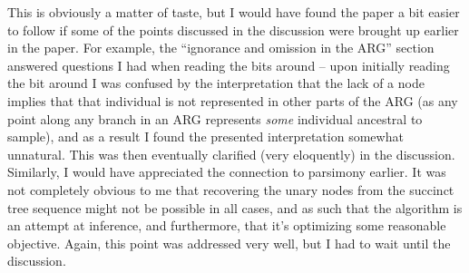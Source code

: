 
\begin{point}{}
 This is obviously a matter of taste, but I would have found the paper a bit easier to follow if some of the points discussed in the discussion were brought up earlier in the paper. For example, the ``ignorance and omission in the ARG'' section 
answered questions I had when reading the bits around  -- upon initially reading the bit around 
I was confused by the interpretation that the lack of a node implies that that individual is not represented in other parts of the ARG (as any point along any branch in an ARG represents \emph{some} individual ancestral to sample), and as a result I found the presented interpretation somewhat unnatural.
This was then eventually clarified (very eloquently) in the discussion.
Similarly, I would have appreciated the connection to parsimony earlier.
It was not completely obvious to me that recovering the unary nodes from the succinct tree sequence might not be possible in all cases, and as such that the algorithm is an attempt at inference, and furthermore, that it's optimizing some reasonable objective. Again, this point was addressed very well, but I had to wait until the discussion.
\end{point}





